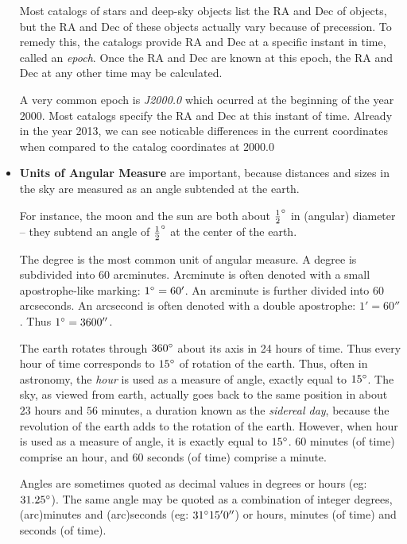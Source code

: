 \begin{itemize}
  Most catalogs of stars and deep-sky objects list the RA and Dec of
  objects, but the RA and Dec of these objects actually vary because
  of precession. To remedy this, the catalogs provide RA and Dec at a
  specific instant in time, called an \emph{epoch}. Once the RA and
  Dec are known at this epoch, the RA and Dec at any other time may be
  calculated.

  A very common epoch is \emph{J2000.0} which ocurred at the beginning
  of the year 2000. Most catalogs specify the RA and Dec at this
  instant of time. Already in the year 2013, we can see noticable
  differences in the current coordinates when compared to the catalog
  coordinates at 2000.0

\item \textbf{Units of Angular Measure} are important, because
  distances and sizes in the sky are measured as an angle subtended at
  the earth.

  For instance, the moon and the sun are both about $\frac{1}{2}
  ^\circ$ in (angular) diameter -- they subtend an angle of
  $\frac{1}{2}^\circ$ at the center of the earth.

  The degree is the most common unit of angular measure. A degree is
  subdivided into $60$ arcminutes. Arcminute is often denoted with a
  small apostrophe-like marking: $1^\circ = 60'$. An arcminute is
  further divided into $60$ arcseconds. An arcsecond is often denoted
  with a double apostrophe: $1' = 60''$. Thus $1^\circ = 3600''$.

  The earth rotates through $360^\circ$ about its axis in 24 hours of
  time. Thus every hour of time corresponds to $15^\circ$ of rotation
  of the earth. Thus, often in astronomy, the \emph{hour} is used as a
  measure of angle, exactly equal to $15^\circ$. The sky, as viewed
  from earth, actually goes back to the same position in about $23$
  hours and $56$ minutes, a duration known as the \emph{sidereal day},
  because the revolution of the earth adds to the rotation of the
  earth. However, when hour is used as a measure of angle, it is
  exactly equal to $15^\circ$. 60 minutes (of time) comprise an
  hour, and 60 seconds (of time) comprise a minute.

  Angles are sometimes quoted as decimal values in degrees or hours
  (eg: $31.25^\circ$). The same angle may be quoted as a combination
  of integer degrees, (arc)minutes and (arc)seconds (eg: $31^\circ
  15' 0''$) or hours, minutes (of time) and seconds (of time).


\end{itemize}
